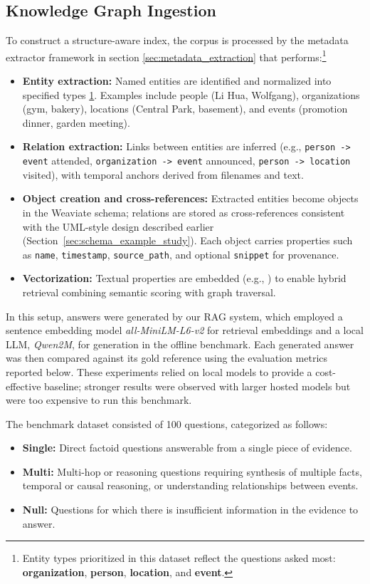 \subsection{Knowledge Graph Ingestion}
To construct a structure-aware index, the corpus is processed by the metadata extractor framework in section \ref{sec:metadata_extraction} that performs:\footnote{\label{footnote:entity_types} Entity types prioritized in this dataset reflect the questions asked most: \textbf{organization}, \textbf{person}, \textbf{location}, and \textbf{event}.}
\begin{itemize}
    \item \textbf{Entity extraction:} Named entities are identified and normalized into specified types \ref{footnote:entity_types}. Examples include people (Li Hua, Wolfgang), organizations (gym, bakery), locations (Central Park, basement), and events (promotion dinner, garden meeting).
    \item \textbf{Relation extraction:} Links between entities are inferred (e.g., \texttt{person -> event} attended, \texttt{organization -> event} announced, \texttt{person -> location} visited), with temporal anchors derived from filenames and text.
    \item \textbf{Object creation and cross-references:} Extracted entities become objects in the Weaviate schema; relations are stored as cross-references consistent with the UML-style design described earlier (Section~\ref{sec:schema_example_study}). Each object carries properties such as \texttt{name}, \texttt{timestamp}, \texttt{source\_path}, and optional \texttt{snippet} for provenance.
    \item \textbf{Vectorization:} Textual properties are embedded (e.g., ) to enable hybrid retrieval combining semantic scoring with graph traversal.
\end{itemize}

In this setup, answers were generated by our RAG system, which employed a sentence embedding model \textit{all-MiniLM-L6-v2} for retrieval embeddings and a local \gls{LLM}, \textit{Qwen2M}, for generation in the offline benchmark. 
Each generated answer was then compared against its gold reference using the evaluation metrics reported below. 
These experiments relied on local models to provide a cost-effective baseline; stronger results were observed with larger hosted models but were too expensive to run this benchmark.

The benchmark dataset consisted of 100 questions, categorized as follows:
\begin{itemize}
    \item \textbf{Single:} Direct factoid questions answerable from a single piece of evidence.
    \item \textbf{Multi:} Multi-hop or reasoning questions requiring synthesis of multiple facts, temporal or causal reasoning, or understanding relationships between events.
    \item \textbf{Null:} Questions for which there is insufficient information in the evidence to answer.
\end{itemize}


